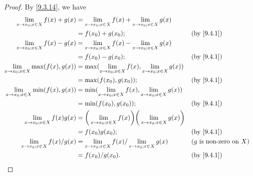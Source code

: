 \begin{proof}
  By \cref{9.3.14}, we have
  \begin{align*}
    \lim_{x \to x_0 ; x \in X} f(x) + g(x)      & = \lim_{x \to x_0 ; x \in X} f(x) + \lim_{x \to x_0 ; x \in X} g(x)                                                               \\
                                                & = f(x_0) + g(x_0);                                                                       &  & \text{(by \cref{9.4.1})}            \\
    \lim_{x \to x_0 ; x \in X} f(x) - g(x)      & = \lim_{x \to x_0 ; x \in X} f(x) - \lim_{x \to x_0 ; x \in X} g(x)                                                               \\
                                                & = f(x_0) - g(x_0);                                                                       &  & \text{(by \cref{9.4.1})}            \\
    \lim_{x \to x_0 ; x \in X} \max(f(x), g(x)) & = \max(\lim_{x \to x_0 ; x \in X} f(x), \lim_{x \to x_0 ; x \in X} g(x))                                                          \\
                                                & = \max(f(x_0), g(x_0));                                                                  &  & \text{(by \cref{9.4.1})}            \\
    \lim_{x \to x_0 ; x \in X} \min(f(x), g(x)) & = \min(\lim_{x \to x_0 ; x \in X} f(x), \lim_{x \to x_0 ; x \in X} g(x))                                                          \\
                                                & = \min(f(x_0), g(x_0));                                                                  &  & \text{(by \cref{9.4.1})}            \\
    \lim_{x \to x_0 ; x \in X} f(x) g(x)        & = \bigg(\lim_{x \to x_0 ; x \in X} f(x)\bigg)\bigg(\lim_{x \to x_0 ; x \in X} g(x)\bigg)                                          \\
                                                & = f(x_0) g(x_0);                                                                         &  & \text{(by \cref{9.4.1})}            \\
    \lim_{x \to x_0 ; x \in X} f(x) / g(x)      & = \lim_{x \to x_0 ; x \in X} f(x) / \lim_{x \to x_0 ; x \in X} g(x)                      &  & \text{(\(g\) is non-zero on \(X\))} \\
                                                & = f(x_0) / g(x_0).                                                                       &  & \text{(by \cref{9.4.1})}            \\
  \end{align*}
\end{proof}


